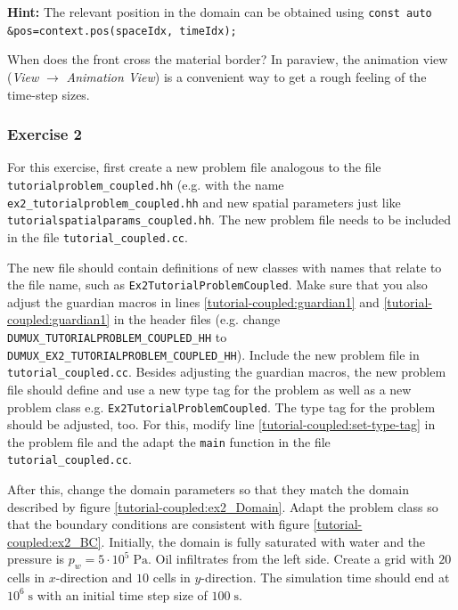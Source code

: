 \begin{enumerate}
\textbf{Hint:} The relevant position in the domain can be obtained using
\texttt{const auto \&pos=context.pos(spaceIdx, timeIdx);}

When does the front cross the material border? In paraview, the
animation view (\textit{View} $\rightarrow$ \textit{Animation View})
is a convenient way to get a rough feeling of the time-step sizes.
\end{enumerate}

\subsubsection{Exercise 2}

For this exercise, first create a new problem file analogous to the
file \texttt{tutorialproblem\_coupled.hh} (e.g. with the name
\texttt{ex2\_tutorialproblem\_coupled.hh} and new spatial parameters
just like \texttt{tutorialspatialparams\_coupled.hh}. The new problem
file needs to be included in the file \texttt{tutorial\_coupled.cc}.

The new file should contain definitions of new classes with names that
relate to the file name, such as
\texttt{Ex2TutorialProblemCoupled}. Make sure that you also adjust the
guardian macros in lines \ref{tutorial-coupled:guardian1} and
\ref{tutorial-coupled:guardian1} in the header files (e.g. change
\mbox{\texttt{DUMUX\_TUTORIALPROBLEM\_COUPLED\_HH}} to
\mbox{\texttt{DUMUX\_EX2\_TUTORIALPROBLEM\_COUPLED\_HH}}). Include the
new problem file in \texttt{tutorial\_coupled.cc}.  Besides adjusting
the guardian macros, the new problem file should define and use a new
type tag for the problem as well as a new problem class
e.g. \mbox{\texttt{Ex2TutorialProblemCoupled}}. The type tag for the
problem should be adjusted, too. For this, modify line
\ref{tutorial-coupled:set-type-tag} in the problem file and the adapt
the \texttt{main} function in the file \texttt{tutorial\_coupled.cc}.

After this, change the domain parameters so that they match the domain
described by figure \ref{tutorial-coupled:ex2_Domain}. Adapt the
problem class so that the boundary conditions are consistent with
figure \ref{tutorial-coupled:ex2_BC}. Initially, the domain is fully
saturated with water and the pressure is $p_w = 5\cdot
10^5\;\text{Pa}$. Oil infiltrates from the left side. Create a grid
with $20$ cells in $x$-direction and $10$ cells in $y$-direction. The
simulation time should end at $10^6\;\text{s}$ with an initial time
step size of $100\;\text{s}$.

